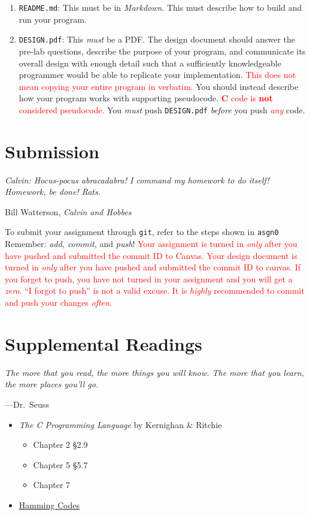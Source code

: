 \documentclass[11pt]{article}
\begin{document}
\begin{enumerate}
  \item \texttt{README.md}: This must be in \emph{Markdown}. This must describe
    how to build and run your program.

  \item \texttt{DESIGN.pdf}: This \emph{must} be a PDF\@. The design document
    should answer the pre-lab questions, describe the purpose of your program,
    and communicate its overall design with enough detail such that a sufficiently
    knowledgeable programmer would be able to replicate your implementation. 
    \textcolor{red}{This does not mean copying your entire program in verbatim.}
    You should instead describe how your program works with supporting pseudocode.
    \textcolor{red}{\textbf{C} code is \textbf{not} considered pseudocode.} You
    \emph{must} push \texttt{DESIGN.pdf} \emph{before} you push
    \textcolor{red}{\emph{any}} code.
\end{enumerate}


\section{Submission}

\textwidth
\epigraph{\emph{Calvin: Hocus-pocus abracadabra! I command my homework to do
itself! Homework, be done! Rats.}}{Bill Watterson, \emph{Calvin and Hobbes}}

To submit your assignment through \texttt{git}, refer to the steps shown in
\texttt{asgn0} Remember: \emph{add, commit,} and \emph{push}!
\textcolor{red}{Your assignment is turned in \emph{only} after you have pushed
and submitted the commit ID to Canvas. Your design document is turned in \emph{only}
after you have pushed and submitted the commit ID to canvas.
If you forget to push, you have not turned in your assignment and you will get a
\emph{zero}. ``I forgot to push'' is not a valid excuse. It is \emph{highly}
recommended to commit and push your changes \emph{often}.}


\section{Supplemental Readings}

\epigraph{\emph{The more that you read, the more things you will know. The
more that you learn, the more places you'll go.}}{---Dr.\ Seuss}

\begin{itemize}
  \item \textit{The C Programming Language} by Kernighan \& Ritchie
  \begin{itemize}
    \item Chapter 2 \S 2.9
    \item Chapter 5 \S 5.7
    \item Chapter 7
  \end{itemize}
  \item \href{https://en.wikipedia.org/wiki/Hamming_code}{Hamming Codes}
\end{itemize}
\end{document}
